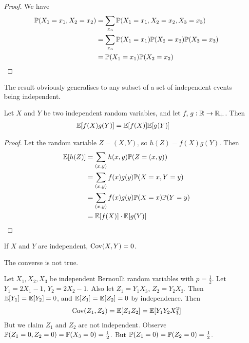 \documentclass{../../template/note}
\begin{document}
    \begin{proof}
        We have
        \begin{align*}
            \mathbb P(X_1 = x_1, X_2 = x_2) &= \sum_{x_3} \mathbb P(X_1 = x_1, X_2 = x_2, X_3 = x_3) \\
            &= \sum_{x_3} \mathbb P(X_1 = x_1) \mathbb P(X_2 = x_2) \mathbb P(X_3 = x_3) \\
            &= \mathbb P(X_1 = x_1)\mathbb P(X_2 = x_2)
        \end{align*}
    \end{proof}
    
    \begin{remark*}
        The result obviously generalises to any subset of a set of independent events being independent.
    \end{remark*}
    
    \begin{lemma}
        Let \(X\) and \(Y\) be two independent random variables, and let \(f\), \(g: \mathbb R \to \mathbb R_{+}\). Then
        \begin{align*}
            \mathbb E[f(X)g(Y)] &= \mathbb E[f(X)]\mathbb E[g(Y)]
        \end{align*}
    \end{lemma}
    
    \begin{proof}
        Let the random variable \(Z = (X, Y)\), so \(h(Z) = f(X)g(Y)\). Then
        \begin{align*}
            \mathbb E[h(Z)] &= \sum_{(x, y)}h(x, y) \mathbb P(Z = (x, y)) \\
            &= \sum_{(x, y)}f(x)g(y) \mathbb P(X = x, Y = y) \\
            &= \sum_{(x, y)}f(x)g(y) \mathbb P(X = x)\mathbb P(Y = y) \\
            &= \mathbb E[f(X)] \cdot \mathbb E[g(Y)]
        \end{align*}
    \end{proof}
    
    \begin{proposition}
        If \(X\) and \(Y\) are independent, \(\operatorname{Cov}(X, Y) = 0\).
    \end{proposition}
    
    \begin{remark*}
        The converse is not true.
    \end{remark*}
    
    \begin{example}
        Let \(X_1, X_2, X_3\) be independent Bernoulli random variables with \(p=\frac{1}{2}\). Let \(Y_1 = 2X_1-1\), \(Y_2 = 2X_2-1\). Also let \(Z_1 = Y_1X_3\), \(Z_2 = Y_2X_3\). Then \(\mathbb E[Y_1] = \mathbb E[Y_2] = 0\), and \(\mathbb E[Z_1] = \mathbb E[Z_2] = 0\) by independence. Then
        \begin{align*}
            \operatorname{Cov}(Z_1, Z_2) = \mathbb E[Z_1Z_2] = \mathbb E[Y_1Y_2X_3^2]
        \end{align*}
        But we claim \(Z_1\) and \(Z_2\) are not independent. Observe \(\mathbb P(Z_1 = 0, Z_2 = 0) = \mathbb P(X_3 = 0) = \frac{1}{2}\). But \(\mathbb P(Z_1 = 0) = \mathbb P(Z_2 = 0) = \frac 1 2\).
    \end{example}
    
\end{document}
